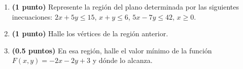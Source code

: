 
\begin{enumerate}[label=\alph*)]
\item \textbf{(1 punto)} Represente la región del plano determinada por las siguientes inecuaciones: $2x+5y\leq15$, $x+y\leq6$, $5x-7y\leq42$, $x\geq0$.
\item \textbf{(1 punto)} Halle los vértices de la región anterior.
\item \textbf{(0.5 puntos)} En esa región, halle el valor mínimo de la función $F(x,y)=-2x-2y+3$ y dónde lo alcanza.
\end{enumerate}
